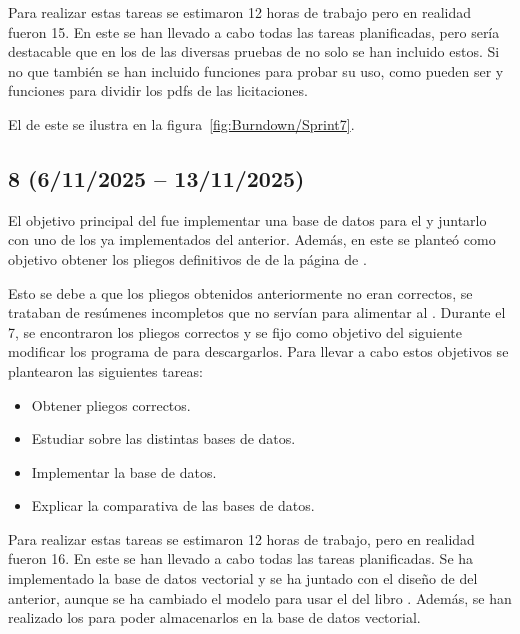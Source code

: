 Para realizar estas tareas se estimaron 12 horas de trabajo pero en realidad fueron 15. En este  se han llevado a cabo todas las tareas planificadas, pero sería destacable que en los  de las diversas pruebas de  no solo se han incluido estos. Si no que también se han incluido funciones para probar su uso, como pueden ser  y funciones para dividir los pdfs de las licitaciones.

El  de este  se ilustra en la figura~\ref{fig:Burndown/Sprint7}.

\subsection{ 8 (6/11/2025 -- 13/11/2025)}

El objetivo principal del  fue implementar una base de datos para el  y juntarlo con uno de los  ya implementados del  anterior. Además, en este  se planteó como objetivo obtener los pliegos definitivos de de la página de . 

Esto se debe a que los pliegos obtenidos anteriormente no eran correctos, se trataban de resúmenes incompletos que no servían para alimentar al . Durante el  7, se encontraron los pliegos correctos y se fijo como objetivo del siguiente  modificar los programa de  para descargarlos. 
Para llevar a cabo estos objetivos se plantearon las siguientes tareas:
\begin{itemize}
\tightlist
	\item Obtener pliegos correctos.
	\item Estudiar sobre las distintas bases de datos.
	\item Implementar la base de datos.
	\item Explicar la comparativa de las bases de datos.
\end{itemize}

Para realizar estas tareas se estimaron 12 horas de trabajo, pero en realidad fueron 16. En este  se han llevado a cabo todas las tareas planificadas. Se ha implementado la base de datos vectorial  y se ha juntado con el diseño de  del  anterior, aunque se ha cambiado el modelo para usar el del libro . Además, se han realizado los  para poder almacenarlos en la base de datos vectorial.

